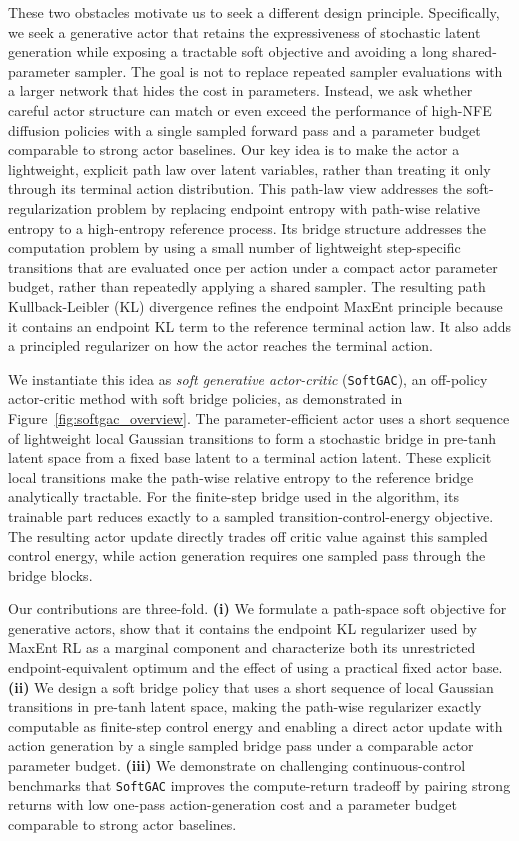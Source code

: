 \documentclass[11pt]{article}
\newcommand{\myalgo}{\texttt{SoftGAC}\xspace}
\begin{document}
These two obstacles motivate us to seek a different design principle. Specifically, we seek a generative actor that retains the expressiveness of stochastic latent generation while exposing a tractable soft objective and avoiding a long shared-parameter sampler. The goal is not to replace repeated sampler evaluations with a larger network that hides the cost in parameters. Instead, we ask whether careful actor structure can match or even exceed the performance of high-NFE diffusion policies with a single sampled forward pass and a parameter budget comparable to strong actor baselines. Our key idea is to make the actor a lightweight, explicit path law over latent variables, rather than treating it only through its terminal action distribution. This path-law view addresses the soft-regularization problem by replacing endpoint entropy with path-wise relative entropy to a high-entropy reference process. Its bridge structure addresses the computation problem by using a small number of lightweight step-specific transitions that are evaluated once per action under a compact actor parameter budget, rather than repeatedly applying a shared sampler. The resulting path Kullback-Leibler (KL) divergence refines the endpoint MaxEnt principle because it contains an endpoint KL term to the reference terminal action law. It also adds a principled regularizer on how the actor reaches the terminal action.

We instantiate this idea as \emph{soft generative actor-critic} (\myalgo), an off-policy actor-critic method with soft bridge policies, as demonstrated in Figure~\ref{fig:softgac_overview}. The parameter-efficient actor uses a short sequence of lightweight local Gaussian transitions to form a stochastic bridge in pre-tanh latent space from a fixed base latent to a terminal action latent. These explicit local transitions make the path-wise relative entropy to the reference bridge analytically tractable. For the finite-step bridge used in the algorithm, its trainable part reduces exactly to a sampled transition-control-energy objective. The resulting actor update directly trades off critic value against this sampled control energy, while action generation requires one sampled pass through the bridge blocks.

Our contributions are three-fold. \textbf{(i)} We formulate a path-space soft objective for generative actors, show that it contains the endpoint KL regularizer used by MaxEnt RL as a marginal component and characterize both its unrestricted endpoint-equivalent optimum and the effect of using a practical fixed actor base. \textbf{(ii)} We design a soft bridge policy that uses a short sequence of local Gaussian transitions in pre-tanh latent space, making the path-wise regularizer exactly computable as finite-step control energy and enabling a direct actor update with action generation by a single sampled bridge pass under a comparable actor parameter budget. \textbf{(iii)} We demonstrate on challenging continuous-control benchmarks that \myalgo improves the compute-return tradeoff by pairing strong returns with low one-pass action-generation cost and a parameter budget comparable to strong actor baselines.
\end{document}
